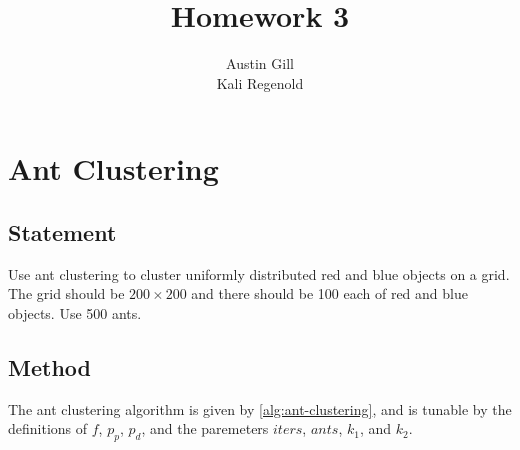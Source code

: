 \documentclass[12pt]{article}
\title{Homework 3}
\author{Austin Gill \\ Kali Regenold}
\begin{document}
\maketitle
\begingroup
\hypersetup{linkcolor=black}
\tableofcontents
\endgroup
\newpage

\section{Ant Clustering}

\subsection{Statement}

Use ant clustering to cluster uniformly distributed red and blue objects on a grid.
The grid should be $200 \times 200$ and there should be 100 each of red and blue objects.
Use 500 ants.

\subsection{Method}

The ant clustering algorithm is given by \autoref{alg:ant-clustering}, and is tunable by the definitions of $f$, $p_p$, $p_d$, and the paremeters $iters$, $ants$, $k_1$, and $k_2$.
\end{document}
